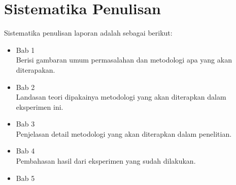 \section{Sistematika Penulisan}
Sistematika penulisan laporan adalah sebagai berikut:
\begin{itemize}
	\item Bab 1 \babSatu \\
	Berisi gambaran umum permasalahan dan metodologi apa yang akan diterapakan.
	\item Bab 2 \babDua \\
	Landasan teori dipakainya metodologi yang akan diterapkan dalam eksperimen ini.
	\item Bab 3 \babTiga \\
	Penjelasan detail metodologi yang akan diterapkan dalam penelitian.
	\item Bab 4 \babEmpat \\
	Pembahasan hasil dari eksperimen yang sudah dilakukan.
	\item Bab 5 \kesimpulan \\
\end{itemize}

